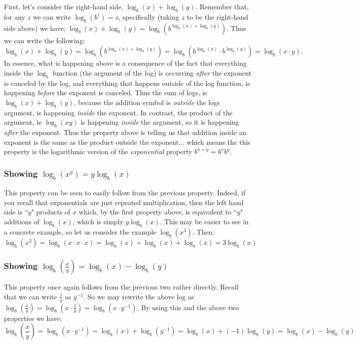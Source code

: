 \documentclass{ximeraXloud}
\begin{document}
        First, let's consider the right-hand side, $\log_b(x) + \log_b(y)$. Remember that, for any $z$ we can write $\log_b(b^z) = z$, specifically (taking $z$ to be the right-hand side above) we have; $\log_b(x) + \log_b(y) = \log_b\left( b^{\log_b(x) + \log_b(y)} \right)$. Thus we can write the following:
        \[
            \log_b(x) + \log_b(y)   = \log_b\left( b^{\log_b(x) + \log_b(y)} \right) 
                                    = \log_b\left( b^{\log_b(x)}\cdot b^{\log_b(y)}\right) 
                                    = \log_b(x \cdot y).
        \]
        In essence, what is happening above is a consequence of the fact that everything inside the $\log_b$ function (the argument of the log) is occurring \textit{after} the exponent is canceled by the log, and everything that happens outside of the log function, is happening \textit{before} the exponent is canceled. Thus the sum of logs, ie $\log_b(x) + \log_b(y)$, because the addition symbol is \textit{outside} the logs argument, is happening \textit{inside} the exponent. In contrast, the product of the argument, ie $\log_b(xy)$ is happening \textit{inside} the argument, so it is happening \textit{after} the exponent. Thus the property above is telling us that addition inside an exponent is the same as the product outside the exponent... which means the this property is the logarithmic version of the \textit{exponential} property $b^{x+y} = b^xb^y$.
        
    \subsubsection*{Showing $\log_b(x^y) = y\log_b(x)$}
        This property can be seen to easily follow from the previous property. Indeed, if you recall that exponentials are just repeated multiplication, then the left hand side is ``$y$" products of $x$ which, by the first property above, is equivalent to ``$y$" additions of $\log_b(x)$, which is simply $y\log_b(x)$. This may be easier to see in a concrete example, so let us consider the example $\log_b (x^3)$. Then;
        \[
            \log_b(x^3) = \log_b(x\cdot x\cdot x) = \log_b(x) + \log_b(x) + \log_b(x) = 3\log_b(x)
        \]
    
    \subsubsection*{Showing $\log_b\left(\frac{x}{y}\right) = \log_b(x) - \log_b(y)$}
        This property once again follows from the previous two rather directly. Recall that we can write $\frac{1}{y}$ as $y^{-1}$. So we may rewrite the above log as $\log_b\left(\frac{x}{y}\right) = \log_b\left(x \cdot \frac{1}{y}\right) = \log_b\left(x\cdot y^{-1}\right)$. By using this and the above two properties we have;
        \[
            \log_b\left(\frac{x}{y}\right)  = \log_b\left(x\cdot y^{-1}\right) 
                                            = \log_b(x) + \log_b\left(y^{-1}\right) 
                                            = \log_b(x) + (-1)\log_b(y)
                                            = \log_b(x) - \log_b(y) 
        \]
        
\end{document}
